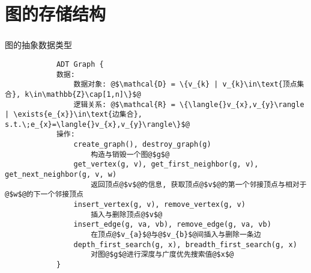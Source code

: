 \section{图的存储结构}

\begin{fragile}
    \frametitle{\insertsectionhead}
    \begin{block}{图的抽象数据类型}
        \begin{verbatim}
            ADT Graph {
            数据:
                数据对象: @$\mathcal{D} = \{v_{k} | v_{k}\in\text{顶点集合}, k\in\mathbb{Z}\cap[1,n]\}$@
                逻辑关系: @$\mathcal{R} = \{\langle{}v_{x},v_{y}\rangle | \exists{e_{x}}\in\text{边集合}, s.t.\;e_{x}=\langle{}v_{x},v_{y}\rangle\}$@
            操作:
                create_graph(), destroy_graph(g)
                    构造与销毁一个图@$g$@
                get_vertex(g, v), get_first_neighbor(g, v), get_next_neighbor(g, v, w)
                    返回顶点@$v$@的信息, 获取顶点@$v$@的第一个邻接顶点与相对于@$w$@的下一个邻接顶点
                insert_vertex(g, v), remove_vertex(g, v)
                    插入与删除顶点@$v$@
                insert_edge(g, va, vb), remove_edge(g, va, vb)
                    在顶点@$v_{a}$@与@$v_{b}$@间插入与删除一条边
                depth_first_search(g, x), breadth_first_search(g, x)
                    对图@$g$@进行深度与广度优先搜索值@$x$@
            }
        \end{verbatim}
    \end{block}
\end{fragile}

